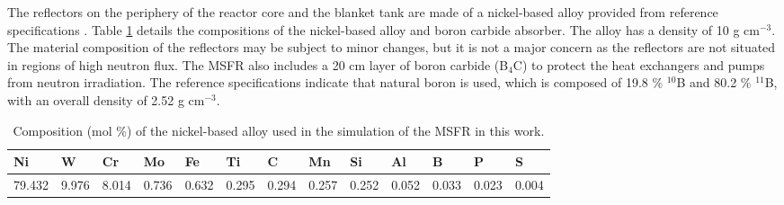 The reflectors on the periphery of the reactor core and the blanket tank are
made of a nickel-based alloy provided from reference specifications
\cite{delpech_reactor_2009}. Table \ref{table:refl} details the compositions
of the nickel-based alloy and boron carbide absorber. The alloy has a density
of 10 g cm$^{-3}$. The material composition of the reflectors may be subject
to minor changes, but it is not a major concern as the reflectors are not
situated in regions of high neutron flux. The \gls{MSFR} also includes a 20 cm
layer of boron carbide (B$_4$C) to protect the heat exchangers and pumps from
neutron irradiation. The reference specifications indicate that natural boron
is used, which is composed of 19.8 \% $^{10}$B and 80.2 \% $^{11}$B, with an
overall density of 2.52 g cm$^{-3}$. 
%
\begin{table}[htb!]
\footnotesize
\centering
\caption{Composition (mol \%) of the nickel-based alloy used in the simulation
of the \gls{MSFR} in this work.}
\begin{tabular}{l l l l l l l l l l l l l}
\toprule
Ni & W & Cr & Mo & Fe & Ti & C & Mn & Si & Al & B & P & S \\
\midrule
79.432 & 9.976 & 8.014 & 0.736 & 0.632 & 0.295 & 0.294 & 0.257 & 0.252 & 0.052 & 0.033 & 0.023 & 0.004 \\
\bottomrule
\end{tabular}
\label{table:refl}
\end{table}
